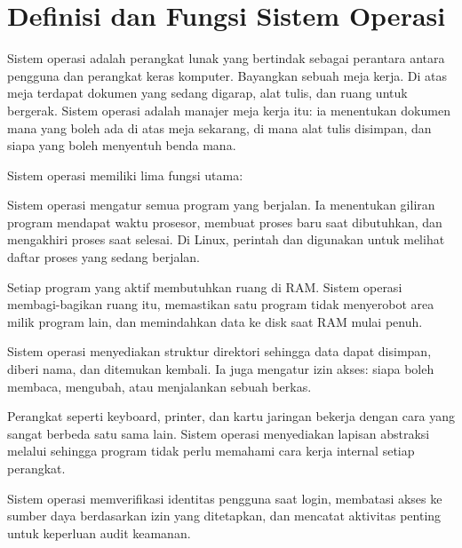 \section{Definisi dan Fungsi Sistem Operasi}
\label{sec:os-basics}

Sistem operasi adalah perangkat lunak yang bertindak sebagai perantara antara pengguna
dan perangkat keras komputer. Bayangkan sebuah meja kerja. Di atas meja terdapat dokumen
yang sedang digarap, alat tulis, dan ruang untuk bergerak. Sistem operasi adalah manajer
meja kerja itu: ia menentukan dokumen mana yang boleh ada di atas meja sekarang, di mana
alat tulis disimpan, dan siapa yang boleh menyentuh benda mana.

Sistem operasi memiliki lima fungsi utama:

\begin{description}[noitemsep,topsep=2pt,parsep=0pt]
    \item[Manajemen Proses] Sistem operasi mengatur semua program yang berjalan. Ia
    menentukan giliran program mendapat waktu prosesor, membuat proses baru saat
    dibutuhkan, dan mengakhiri proses saat selesai. Di Linux, perintah  dan
     digunakan untuk melihat daftar proses yang sedang berjalan.

    \item[Manajemen Memori] Setiap program yang aktif membutuhkan ruang di RAM. Sistem
    operasi membagi-bagikan ruang itu, memastikan satu program tidak menyerobot area
    milik program lain, dan memindahkan data ke disk saat RAM mulai penuh.

    \item[Manajemen Berkas] Sistem operasi menyediakan struktur direktori sehingga data
    dapat disimpan, diberi nama, dan ditemukan kembali. Ia juga mengatur izin akses:
    siapa boleh membaca, mengubah, atau menjalankan sebuah berkas.

    \item[Manajemen I/O] Perangkat seperti keyboard, printer, dan kartu jaringan
    bekerja dengan cara yang sangat berbeda satu sama lain. Sistem operasi menyediakan
    lapisan abstraksi melalui  sehingga program tidak perlu memahami cara kerja
    internal setiap perangkat.

    \item[Keamanan dan Proteksi] Sistem operasi memverifikasi identitas pengguna saat
    login, membatasi akses ke sumber daya berdasarkan izin yang ditetapkan, dan mencatat
    aktivitas penting untuk keperluan audit keamanan.
\end{description}

